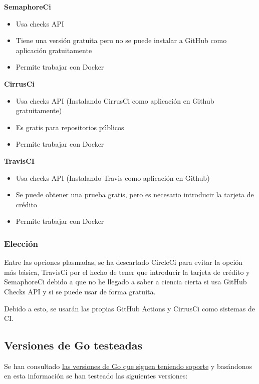 \textbf{SemaphoreCi  \cite{semaphore-ci}}

\begin{itemize}
\item
  Usa checks API
\item
  Tiene una versión gratuita pero no se puede instalar a GitHub como
  aplicación gratuitamente
\item
  Permite trabajar con Docker
\end{itemize}

\textbf{CirrusCi \cite{cirrus-ci}}

\begin{itemize}
\item
  Usa checks API (Instalando CirrusCi como aplicación en Github
  gratuitamente)
\item
  Es gratis para repositorios públicos
\item
  Permite trabajar con Docker
\end{itemize}

\textbf{TravisCI \cite{travis-ci}}

\begin{itemize}
\item
  Usa checks API (Instalando Travis como aplicación en Github)
\item
  Se puede obtener una prueba gratis, pero es necesario introducir la
  tarjeta de crédito
\item
  Permite trabajar con Docker
\end{itemize}

\subsubsection{Elección}

Entre las opciones plasmadas, se ha descartado CircleCi para evitar la
opción más básica, TravisCi por el hecho de tener que introducir la
tarjeta de crédito y SemaphoreCi debido a que no he llegado a saber a
ciencia cierta si usa GitHub Checks API y si se puede usar de forma
gratuita.

Debido a esto, se usarán las propias GitHub Actions y CirrusCi como
sistemas de CI.

\subsection{Versiones de Go testeadas}

Se han consultado \href{https://endoflife.date/go}{las versiones de Go
que siguen teniendo soporte} y basándonos en esta información se han
testeado las siguientes versiones:

